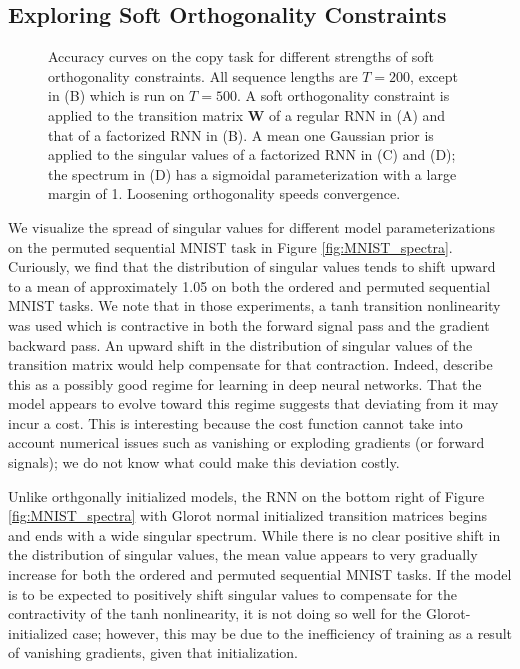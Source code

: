 \documentclass{article} %
\begin{document}
\subsection{Exploring Soft Orthogonality Constraints}

\begin{figure*}[tb!]
\centering
{}
\caption{Accuracy curves on the copy task for different strengths of soft orthogonality constraints. All sequence lengths are $\mathit{T}=200$, except in (B) which is run on $\mathit{T}=500$. A soft orthogonality constraint is applied to the transition matrix $\mathbf{W}$ of a regular RNN in (A) and that of a factorized RNN in (B). A mean one Gaussian prior is applied to the singular values of a factorized RNN in (C) and (D); the spectrum in (D) has a sigmoidal parameterization with a large margin of 1. Loosening orthogonality speeds convergence.}
\label{fig:soft_copy}
\end{figure*}

We visualize the spread of singular values for different model parameterizations on the permuted sequential MNIST task in Figure \ref{fig:MNIST_spectra}. Curiously, we find that the distribution of singular values tends to shift upward to a mean of approximately 1.05 on both the ordered and permuted sequential MNIST tasks. We note that in those experiments, a tanh transition nonlinearity was used which is contractive in both the forward signal pass and the gradient backward pass. An upward shift in the distribution of singular values of the transition matrix would help compensate for that contraction. Indeed, \citet{saxe2013exact} describe this as a possibly good regime for learning in deep neural networks. That the model appears to evolve toward this regime suggests that deviating from it may incur a cost. This is interesting because the cost function cannot take into account numerical issues such as vanishing or exploding gradients (or forward signals); we do not know what could make this deviation costly.

Unlike orthgonally initialized models, the RNN on the bottom right of Figure \ref{fig:MNIST_spectra} with Glorot normal initialized transition matrices begins and ends with a wide singular spectrum. While there is no clear positive shift in the distribution of singular values, the mean value appears to very gradually increase for both the ordered and permuted sequential MNIST tasks. If the model is to be expected to positively shift singular values to compensate for the contractivity of the tanh nonlinearity, it is not doing so well for the Glorot-initialized case; however, this may be due to the inefficiency of training as a result of vanishing gradients, given that initialization.
\end{document}
